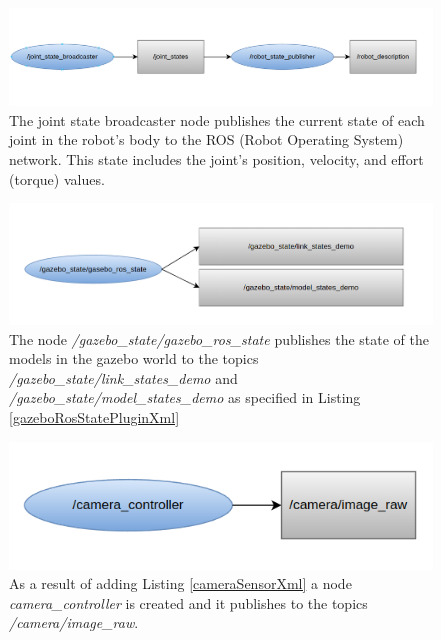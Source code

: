 \documentclass[12pt,oneside]{article}
\begin{document}
\begin{figure}[H]
\centering
\includegraphics[width=0.95\linewidth]{rosgraph00}
\caption{The joint state broadcaster node publishes the current state of each joint in the robot's body to the ROS (Robot Operating System) network. This state includes the joint's position, velocity, and effort (torque) values. }
\label{fig:rosgraph00}
\end{figure}
 
\begin{figure}[H]
\centering
\includegraphics[width=0.95\linewidth]{rosgraph01}
\caption{The node \textit{/gazebo\_state/gazebo\_ros\_state} publishes the state of the models in the gazebo world to the topics \textit{/gazebo\_state/link\_states\_demo} and \textit{/gazebo\_state/model\_states\_demo} as specified in Listing \ref{gazeboRosStatePluginXml}}
\label{fig:rosgraph01}
\end{figure}

\begin{figure}[H]
\centering
\includegraphics[width=0.85\linewidth]{rosgraph02_new}
\caption{As a result of adding Listing \ref{cameraSensorXml} a node \textit{camera\_controller} is created and it publishes to the topics \textit{/camera/image\_raw}.}
\label{fig:rosgraph02}
\end{figure}
\end{document}
